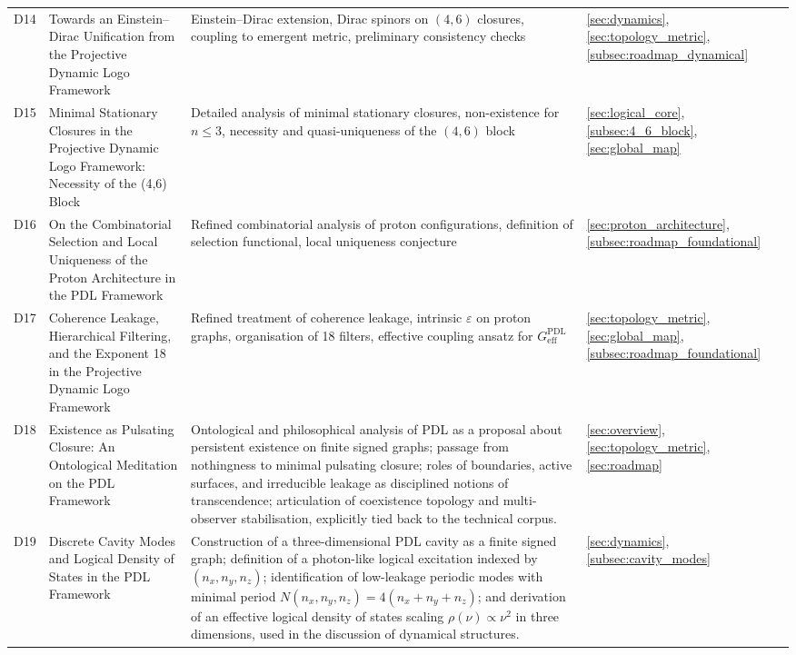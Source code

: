 \documentclass{article}
\newcommand{\PDL}{\mathrm{PDL}}
\begin{document}
\begin{longtable}{@{}p{0.9cm}L{5cm}L{5cm}p{4.4cm}@{}}
  D14 &
  Towards an Einstein--Dirac Unification from the Projective Dynamic Logo Framework &
  Einstein–Dirac extension, Dirac spinors on $(4,6)$ closures, coupling to emergent metric, preliminary consistency checks &
  \ref{sec:dynamics}, \ref{sec:topology_metric}, \ref{subsec:roadmap_dynamical} \\[0.4em]

  D15 &
  Minimal Stationary Closures in the Projective Dynamic Logo Framework: Necessity of the (4,6) Block &
  Detailed analysis of minimal stationary closures, non-existence for $n \leq 3$, necessity and quasi-uniqueness of the $(4,6)$ block &
  \ref{sec:logical_core}, \ref{subsec:4_6_block}, \ref{sec:global_map} \\[0.4em]

  D16 &
  On the Combinatorial Selection and Local Uniqueness of the Proton Architecture in the PDL Framework &
  Refined combinatorial analysis of proton configurations, definition of selection functional, local uniqueness conjecture &
  \ref{sec:proton_architecture}, \ref{subsec:roadmap_foundational} \\[0.4em]

  D17 &
  Coherence Leakage, Hierarchical Filtering, and the Exponent 18 in the Projective Dynamic Logo Framework &
  Refined treatment of coherence leakage, intrinsic $\varepsilon$ on proton graphs, organisation of 18 filters, effective coupling ansatz for $G_{\mathrm{eff}}^{\PDL}$ &
  \ref{sec:topology_metric}, \ref{sec:global_map}, \ref{subsec:roadmap_foundational} \\[0.4em] 

  D18 & 
  Existence as Pulsating Closure: An Ontological Meditation on the PDL Framework & Ontological and philosophical analysis of PDL as a proposal about persistent existence on finite signed graphs; passage from nothingness to minimal pulsating closure; roles of boundaries, active surfaces, and irreducible leakage as disciplined notions of transcendence; articulation of coexistence topology and multi-observer stabilisation, explicitly tied back to the technical corpus. & 
  \ref{sec:overview}, \ref{sec:topology_metric}, \ref{sec:roadmap} \\[0.4em] 
  
  D19 & 
  Discrete Cavity Modes and Logical Density of States in the PDL Framework & Construction of a three-dimensional PDL cavity as a finite signed graph; definition of a photon-like logical excitation indexed by $(n_x,n_y,n_z)$; identification of low-leakage periodic modes with minimal period $N(n_x,n_y,n_z)=4(n_x+n_y+n_z)$; and derivation of an effective logical density of states scaling $\rho(\nu)\propto \nu^2$ in three dimensions, used in the discussion of dynamical structures. & 
  \ref{sec:dynamics}, \ref{subsec:cavity_modes} \\[0.4em]

\end{longtable}
\end{document}

